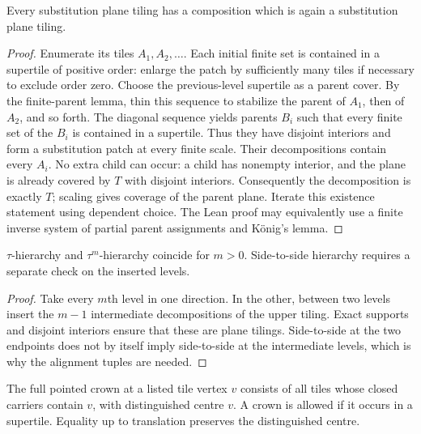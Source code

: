 \begin{lemma}
\label{lem:substitution-hierarchy}
Every substitution plane tiling has a composition which is again a
substitution plane tiling.
\end{lemma}
\begin{proof}
Enumerate its tiles $A_1,A_2,\ldots$. Each initial finite set is contained in
a supertile of positive order: enlarge the patch by sufficiently many
tiles if necessary to exclude order zero. Choose the previous-level
supertile as a parent cover. By the finite-parent lemma, thin this sequence
to stabilize the parent of $A_1$, then of $A_2$, and so forth. The diagonal
sequence yields parents $B_i$ such that every finite set of the $B_i$ is
contained in a supertile. Thus they have disjoint interiors and form a
substitution patch at every finite scale. Their decompositions contain
every $A_i$. No extra child can occur: a child has nonempty interior, and
the plane is already covered by $T$ with disjoint interiors. Consequently
the decomposition is exactly $T$; scaling gives coverage of the parent
plane. Iterate this existence statement using dependent choice.
The Lean proof may equivalently use a finite inverse system of partial
parent assignments and K\"onig's lemma.
\end{proof}

\begin{lemma}\label{lem:hierarchy-step}
$\tau$-hierarchy and $\tau^m$-hierarchy coincide for $m>0$.
Side-to-side hierarchy requires a separate check on the inserted levels.
\end{lemma}
\begin{proof}
Take every $m$th level in one direction. In the other, between two levels
insert the $m-1$ intermediate decompositions of the upper tiling. Exact
supports and disjoint interiors ensure that these are plane tilings.
Side-to-side at the two endpoints does not by itself imply side-to-side
at the intermediate levels, which is why the alignment tuples are needed.
\end{proof}

\begin{definition}\label{def:crown}
The full pointed crown at a listed tile vertex $v$ consists of all tiles
whose closed carriers contain $v$, with distinguished centre $v$.
A crown is allowed if it occurs in a supertile. Equality up to translation
preserves the distinguished centre.
\end{definition}

